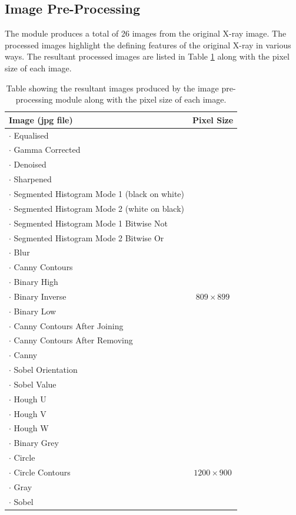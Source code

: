 \documentclass[11pt]{article}
\begin{document}
	\subsection{Image Pre-Processing}
	The module produces a total of 26 images from the original X-ray image. The processed images highlight the defining features of the original X-ray in various ways. The resultant processed images are listed in Table \ref{tb: image table} along with the pixel size of each image. 
	\vspace{-3mm}
	\begin{table}[!h]
		\centering
		\caption{Table showing the resultant images produced by the image pre-processing module along with the pixel size of each image.}
		\label{tb: image table}
		\begin{tabular}{| l | c |}
			\hline
			Image (jpg file) & Pixel Size \\
			\hline \hline
			$\cdot$ Equalised &  \\
			$\cdot$ Gamma Corrected &  \\
			$\cdot$ Denoised & \\
			$\cdot$ Sharpened & \\
			$\cdot$ Segmented Histogram Mode 1 (black on white) & \\
			$\cdot$ Segmented Histogram Mode 2 (white on black) & \\
			$\cdot$ Segmented Histogram Mode 1 Bitwise Not & \\
			$\cdot$ Segmented Histogram Mode 2 Bitwise Or & \\
			$\cdot$ Blur & \\
			$\cdot$ Canny Contours & \\
			$\cdot$ Binary High & \\
			$\cdot$ Binary Inverse & $809 \times 899$ \\
			$\cdot$ Binary Low & \\
			$\cdot$ Canny Contours After Joining & \\
			$\cdot$ Canny Contours After Removing & \\
			$\cdot$ Canny & \\
			$\cdot$ Sobel Orientation & \\
			$\cdot$ Sobel Value & \\
			$\cdot$ Hough U & \\
			$\cdot$ Hough V & \\
			$\cdot$ Hough W & \\
			\hline
			$\cdot$ Binary Grey & \\
			$\cdot$ Circle & \\
			$\cdot$ Circle Contours & $1200 \times 900$ \\
			$\cdot$ Gray & \\
			$\cdot$ Sobel & \\
			\hline
		\end{tabular}
	\end{table}
\end{document}
